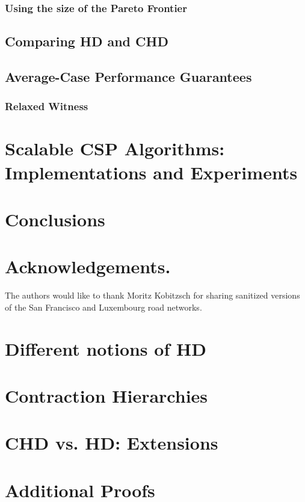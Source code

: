 \documentclass[a4paper,UKenglish]{lipics-v2016}
\theoremstyle{plain}
\begin{document}
\subsubsection{Using the size of the Pareto Frontier}
\label{sec:frontier}


\subsection{Comparing HD and CHD}
\label{ssec:hdvschd}


\subsection{Average-Case Performance Guarantees}
\label{sec:avg_hd}

\subsubsection{Relaxed Witness}
\label{sec:relaxed_witness}


\section{Scalable CSP Algorithms: Implementations and Experiments}
\label{sec:numeric}


\section{Conclusions}
\label{sec:conclu}


\section*{Acknowledgements.}
The authors would like to thank Moritz Kobitzsch for sharing sanitized versions of the San Francisco and Luxembourg road networks.


\appendix
\section{Different notions of HD}
\label{app:generalhd}


\section{Contraction Hierarchies}


\section{CHD vs. HD: Extensions}
\label{app:extn}



\section{Additional Proofs}
\label{sec:proofs}





\end{document}
